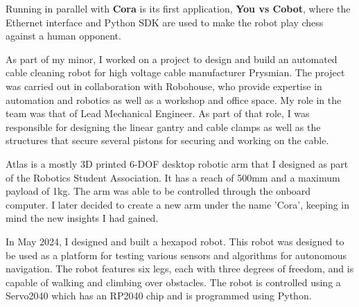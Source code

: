 \documentclass[9pt, a4paper, withhyper]{altacv}
\begin{document}
\begin{paracol}
    \divider
    
     {}
    Running in parallel with \textbf{Cora} is its first application, \textbf{You vs Cobot}, 
    where the Ethernet interface and Python SDK are used 
    to make the robot play chess against a human opponent.

    \divider

     As part of my
    minor, I worked on a project to design and build an automated cable cleaning
    robot for high voltage cable manufacturer Prysmian. 
    The project was carried out in collaboration with
    Robohouse, who provide expertise in automation and robotics as well as a workshop
    and office space. My role in the team was that of Lead Mechanical Engineer. 
    As part of that role, I was responsible for designing the linear gantry and
    cable clamps as well as the structures that secure several pistons for securing and
    working on the cable.

    \divider



     Atlas
    is a mostly 3D printed 6-DOF desktop robotic arm that I designed as part of
    the Robotics Student Association. It has a reach of 500mm and a maximum payload
    of 1kg. The arm was able to be controlled through the onboard computer. I later
    decided to create a new arm under the name 'Cora', keeping in mind
    the new insights I had gained.

    \divider

     In May 2024,
    I designed and built a hexapod robot. This robot was designed to be used as
    a platform for testing various sensors and algorithms for autonomous
    navigation. The robot features six legs, each with three degrees of freedom,
    and is capable of walking and climbing over obstacles. The robot is
    controlled using a Servo2040 which has an RP2040 chip and is programmed
    using Python.


\end{paracol}
\end{document}
